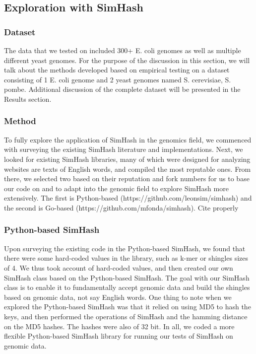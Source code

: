 \documentclass[12pt, letterpaper]{article}
\begin{document}
\subsection{Exploration with SimHash}
\subsubsection{Dataset}
The data that we tested on included 300+ E. coli genomes as well as multiple different yeast genomes. For the purpose of the discussion in this section, we will talk about the methods developed based on empirical testing on a dataset consisting of 1 E. coli genome and 2 yeast genomes named S. cerevisiae, S. pombe. Additional discussion of the complete dataset will be presented in the Results section.

\subsubsection{Method}
To fully explore the application of SimHash in the genomics field, we commenced with surveying the existing SimHash literature and implementations. Next, we looked for existing SimHash libraries, many of which were designed for analyzing websites are texts of English words, and compiled the most reputable ones. From there, we selected two based on their reputation and fork numbers for us to base our code on and to adapt into the genomic field to explore SimHash more extensively. The first is Python-based (https://github.com/leonsim/simhash) and the second is Go-based (https://github.com/mfonda/simhash). \color{red} Cite properly \color{black}

\subsubsection{Python-based SimHash}
Upon surveying the existing code in the Python-based SimHash, we found that there were some hard-coded values in the library, such as k-mer or shingles sizes of 4. We thus took account of hard-coded values, and then created our own SimHash class based on the Python-based SimHash. The goal with our SimHash class is to enable it to fundamentally accept genomic data and build the shingles based on genomic data, not say English words. One thing to note when we explored the Python-based SimHash was that it relied on using MD5 to hash the keys, and then performed the operations of SimHash and the hamming distance on the MD5 hashes. The hashes were also of 32 bit. In all, we coded a more flexible Python-based SimHash library for running our tests of SimHash on genomic data.
\end{document}
